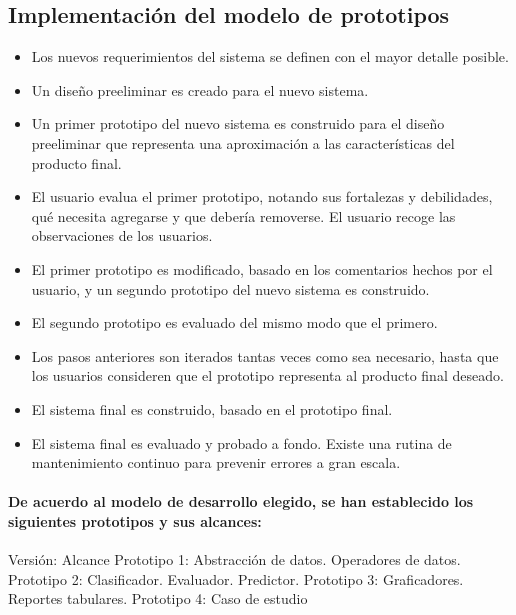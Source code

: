 \subsection{Implementación del modelo de prototipos}
\begin{itemize}
  \item Los nuevos requerimientos del sistema se definen con el mayor detalle posible.
  \item Un diseño preeliminar es creado para el nuevo sistema. 
  \item Un primer prototipo del nuevo sistema es construido para el diseño preeliminar que representa una aproximación a las características del producto final.
  \item El usuario evalua el primer prototipo, notando sus fortalezas y debilidades, qué necesita agregarse y que debería removerse. El usuario recoge las observaciones de los usuarios. 
  \item El primer prototipo es modificado, basado en los comentarios hechos por el usuario, y un segundo prototipo del nuevo sistema es construido.
  \item El segundo prototipo es evaluado del mismo modo que el primero.
  \item Los pasos anteriores son iterados tantas veces como sea necesario, hasta que los usuarios consideren que el prototipo representa al producto final deseado.
  \item El sistema final es construido, basado en el prototipo final.
  \item El sistema final es evaluado y probado a fondo. Existe una rutina de mantenimiento continuo para prevenir errores a gran escala.
\end{itemize}

\paragraph{De acuerdo al modelo de desarrollo elegido, se han establecido los siguientes prototipos y sus alcances:}
Versión: Alcance
Prototipo 1: Abstracción de datos. Operadores de datos.
Prototipo 2: Clasificador. Evaluador. Predictor.
Prototipo 3: Graficadores. Reportes tabulares.
Prototipo 4: Caso de estudio

